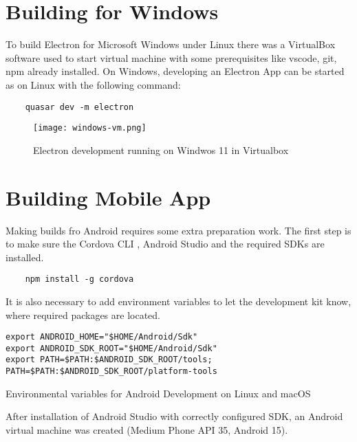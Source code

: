 \section{{Building for Windows}}%
\label{sec:windows}

To build Electron for Microsoft Windows under Linux there was a VirtualBox \autocite{VBox} software used to start virtual machine with some prerequisites like vscode, git, npm already installed. On Windows, developing an Electron App can be started as on Linux with the following command:

\begin{verbatim}
    quasar dev -m electron
\end{verbatim}


\begin{figure}[H]
    \centering
    \texttt{[image: windows-vm.png]}
    \caption[Electron on Windows virtual machine]{\label{fig:windowsvbox} Electron development running on Windwos 11 in Virtualbox }
\end{figure}


\section{{Building Mobile App}}%
\label{sec:mobile}

Making builds fro Android requires some extra preparation work. The first step is to make sure  the Cordova CLI \autocite{CordovaDoc}, Android Studio \autocite{AndroidDev} and the required SDKs are installed.

\begin{verbatim}
    npm install -g cordova
\end{verbatim}


It is also necessary to add environment variables to let the development kit know, where required packages are located.

\begin{listing}[H]
    \begin{verbatim}
export ANDROID_HOME="$HOME/Android/Sdk"
export ANDROID_SDK_ROOT="$HOME/Android/Sdk"
export PATH=$PATH:$ANDROID_SDK_ROOT/tools; PATH=$PATH:$ANDROID_SDK_ROOT/platform-tools
    \end{verbatim}
\caption[Environmental variables for Android SDK on Linux and macOS]{Environmental variables for Android Development on Linux and macOS}
\end{listing}

After installation of Android Studio with correctly configured SDK, an Android virtual machine was created (Medium Phone API 35, Android 15).

